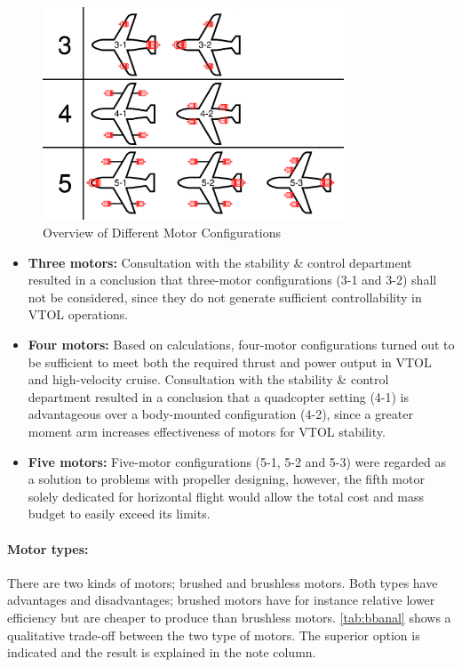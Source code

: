 \begin{figure}[H]
    \centering
    \includegraphics[width=0.8\textwidth]{PowerPropulsion/Figures/propconfig.jpg}
    \caption{Overview of Different Motor Configurations}
    \label{fig:motorconfig}
\end{figure}

\begin{itemize}
    \item \textbf{Three motors:} Consultation with the stability \& control department resulted in a conclusion that three-motor configurations (3-1 and 3-2) shall not be considered, since they do not generate sufficient controllability in VTOL operations.
    \item \textbf{Four motors:} Based on calculations, four-motor configurations turned out to be sufficient to meet both the required thrust and power output in VTOL and high-velocity cruise. Consultation with the stability \& control department resulted in a conclusion that a quadcopter setting (4-1) is advantageous over a body-mounted configuration (4-2), since a greater moment arm increases effectiveness of motors for VTOL stability.
    \item \textbf{Five motors:} Five-motor configurations (5-1, 5-2 and 5-3) were regarded as a solution to problems with propeller designing, however, the fifth motor solely dedicated for horizontal flight would allow the total cost and mass budget to easily exceed its limits.
\end{itemize}

\paragraph{Motor types:} There are two kinds of motors; brushed and brushless motors. Both types have advantages and disadvantages; brushed motors have for instance relative lower efficiency but are cheaper to produce than brushless motors. \autoref{tab:bbanal} shows a qualitative trade-off between the two type of motors. The superior option is indicated and the result is explained in the note column.

